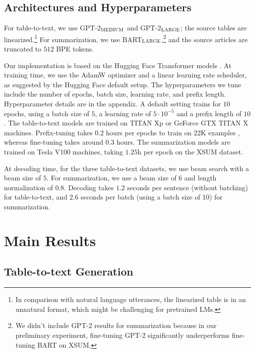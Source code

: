 \subsection{Architectures and Hyperparameters} For table-to-text, we use GPT-2$_{\textsc{MEDIUM}}$ and GPT-2$_{\textsc{LARGE}}$; the source tables are linearized.\footnote{In comparison with natural language utterances, the linearized table is in an unnatural format, which might be challenging for pretrained LMs.} For summarization, we use BART$_{\textsc{LARGE}}$,\footnote{We didn't include GPT-2 results for summarization because in our preliminary experiment, fine-tuning GPT-2 significantly underperforms fine-tuning BART on XSUM.} and the source articles are truncated to $512$ BPE tokens. 

Our implementation is based on the Hugging Face Transformer models \cite{wolf-etal-2020-transformers}. At training time, we use the AdamW optimizer \cite{loshchilov2018decoupled} and a linear learning rate scheduler, as suggested by the Hugging Face default setup.  The hyperparameters we tune include the number of epochs, batch size, learning rate, and prefix length. Hyperparameter details are in the appendix. A default setting trains for $10$ epochs, using a batch size of $5$, a learning rate of $5 \cdot 10^{-5}$ and a prefix length of $10$. The table-to-text models are trained on TITAN Xp or GeForce GTX TITAN X machines. Prefix-tuning takes $0.2$ hours per epochs to train on 22K examples , whereas fine-tuning takes around $0.3$ hours. The summarization models are trained on Tesla V100 machines, taking $1.25$h per epoch on the XSUM dataset. 

At decoding time, for the three table-to-text datasets, we use beam search with a beam size of $5$. For summarization, we use a beam size of $6$ and length normalization of $0.8$. Decoding takes $1.2$ seconds per sentence (without batching) for table-to-text, and $2.6$ seconds per batch (using a batch size of 10) for summarization. 

\section{Main Results}

\label{sec:experiment}

\subsection{Table-to-text Generation}
\label{ssec:table-to-text}

